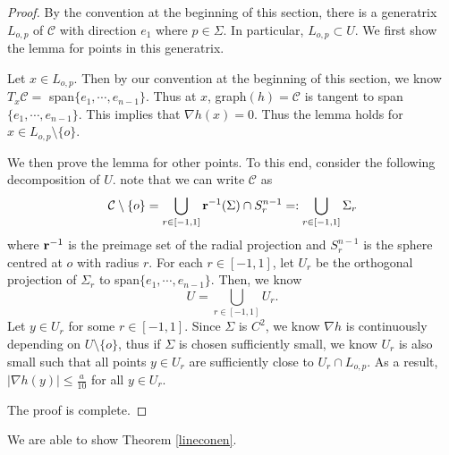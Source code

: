 \documentclass[11pt,a4paper,reqno]{amsart}
\newcommand{\calC}{\mathcal{C}}
\newcommand{\1}{\mathbf{1}}
\numberwithin{equation}{section}
\theoremstyle{plain}
\theoremstyle{definition}
\theoremstyle{remark}
\begin{document}
\begin{proof}
    By the convention at the beginning of this section, there is a generatrix $L_{o,p}$ of $\calC$ with direction $e_1$ where $p \in \Sigma$. In particular, $L_{o,p} \subset U$. We first show the lemma for points in this generatrix.

  Let $x \in L_{o,p}$. Then by our convention at the beginning of this section, we know $T_x\calC =$ span$\{e_1,\cdots,e_{n-1}\}$. Thus at $x$, graph$(h)=\calC$ is tangent to span$\{e_1,\cdots,e_{n-1}\}$. This implies that $\nabla h(x)=0$. Thus the lemma holds for $x \in L_{o,p}\setminus\{o\}$.

  We then prove the lemma for other points. To this end, consider the following decomposition of $U$. note that we can write $\calC$ as
     \begin{equation}\label{sigmar}
       \calC \setminus \{o\}= \bigcup_{r\in[-1,1]} {\bf r}^{-1}(\Sigma) \cap S^{n-1}_r =: \bigcup_{r\in[-1,1]} \Sigma_r
     \end{equation}
  where ${\bf r}^{-1}$ is the preimage set of the radial projection and $S^{n-1}_r$ is the sphere centred at $o$ with radius $r$.
  For each $r \in [-1,1]$, let $U_r$ be the orthogonal projection of $\Sigma_r$ to span$\{e_1,\cdots,e_{n-1}\}$. Then, we know
  $$  U = \bigcup_{r \in [-1,1]} U_r.$$
    Let $y \in U_r$ for some $r \in [-1,1]$.
  Since $\Sigma$ is $C^2$, we know $\nabla h$ is continuously depending on $U\setminus\{o\}$, thus if $\Sigma$ is chosen sufficiently small, we know $U_r$ is also small such that all points $y \in U_r$ are sufficiently close to $U_r \cap L_{o,p}$.
  As a result, $|\nabla h(y)| \le \frac{a}{10}$ for all $y \in U_r$.

  The proof is complete.
\end{proof}



We are able to show Theorem \ref{lineconen}.
\end{document}
